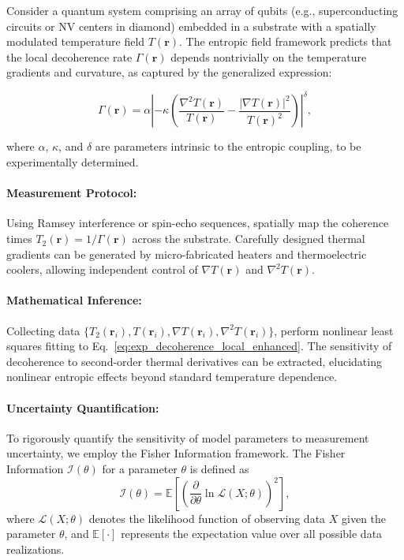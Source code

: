 \documentclass[12pt]{article}
\begin{document}
Consider a quantum system comprising an array of qubits (e.g., superconducting circuits or NV centers in diamond) embedded in a substrate with a spatially modulated temperature field \( T(\mathbf{r}) \). The entropic field framework predicts that the local decoherence rate \(\Gamma(\mathbf{r})\) depends nontrivially on the temperature gradients and curvature, as captured by the generalized expression:

\begin{equation}
\Gamma(\mathbf{r}) = \alpha \left| -\kappa \left( \frac{\nabla^2 T(\mathbf{r})}{T(\mathbf{r})} - \frac{\left|\nabla T(\mathbf{r})\right|^2}{T(\mathbf{r})^2} \right) \right|^\delta,
\label{eq:exp_decoherence_local_enhanced}
\end{equation}

where \(\alpha\), \(\kappa\), and \(\delta\) are parameters intrinsic to the entropic coupling, to be experimentally determined.

\paragraph{Measurement Protocol:} Using Ramsey interference or spin-echo sequences, spatially map the coherence times \( T_2(\mathbf{r}) = 1/\Gamma(\mathbf{r}) \) across the substrate. Carefully designed thermal gradients can be generated by micro-fabricated heaters and thermoelectric coolers, allowing independent control of \(\nabla T(\mathbf{r})\) and \(\nabla^2 T(\mathbf{r})\).

\paragraph{Mathematical Inference:} Collecting data \(\{T_2(\mathbf{r}_i), T(\mathbf{r}_i), \nabla T(\mathbf{r}_i), \nabla^2 T(\mathbf{r}_i)\}\), perform nonlinear least squares fitting to Eq.~\eqref{eq:exp_decoherence_local_enhanced}. The sensitivity of decoherence to second-order thermal derivatives can be extracted, elucidating nonlinear entropic effects beyond standard temperature dependence.

\paragraph{Uncertainty Quantification:} To rigorously quantify the sensitivity of model parameters to measurement uncertainty, we employ the Fisher Information framework. The Fisher Information \(\mathcal{I}(\theta)\) for a parameter \(\theta\) is defined as
\begin{equation}
\mathcal{I}(\theta) = \mathbb{E} \left[ \left( \frac{\partial}{\partial \theta} \ln \mathcal{L}(X; \theta) \right)^2 \right],
\label{eq:fisher_information}
\end{equation}
where \(\mathcal{L}(X; \theta)\) denotes the likelihood function of observing data \(X\) given the parameter \(\theta\), and \(\mathbb{E}[\cdot]\) represents the expectation value over all possible data realizations.
\end{document}

